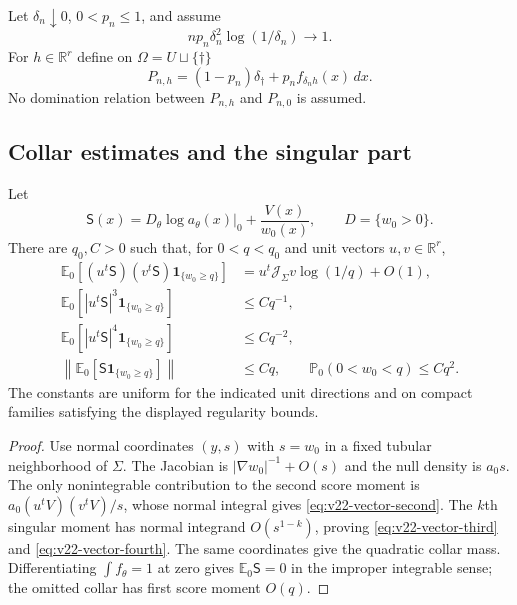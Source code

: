 Let $\delta_n\downarrow0$, $0<p_n\le1$, and assume
\begin{equation}\label{eq:v22-vector-rate}
 n p_n\delta_n^2\log(1/\delta_n)\longrightarrow1.
\end{equation}
For $h\in\mathbb R^r$ define on
$\Omega=U\sqcup\{\dagger\}$
\begin{equation}\label{eq:v22-thinned-family}
 P_{n,h}=(1-p_n)\delta_\dagger+p_nf_{\delta_nh}(x)\,dx.
\end{equation}
No domination relation between $P_{n,h}$ and $P_{n,0}$ is assumed.

\subsection{Collar estimates and the singular part}

\begin{lemma}
\label{lem:v22-vector-collar}
Let
\[
 \mathsf S(x)=D_\theta\log a_\theta(x)|_0+\frac{V(x)}{w_0(x)},
 \qquad D=\{w_0>0\}.
\]
There are $q_0,C>0$ such that, for $0<q<q_0$ and unit vectors
$u,v\in\mathbb R^r$,
\begin{align}
 \mathbb E_0[(u^t\mathsf S)(v^t\mathsf S)
       \mathbf1_{\{w_0\ge q\}}]
 &=u^t\mathcal J_\Sigma v\log(1/q)+O(1),
                                      \label{eq:v22-vector-second}\\
 \mathbb E_0[|u^t\mathsf S|^3\mathbf1_{\{w_0\ge q\}}]
 &\le Cq^{-1},                       \label{eq:v22-vector-third}\\
 \mathbb E_0[|u^t\mathsf S|^4\mathbf1_{\{w_0\ge q\}}]
 &\le Cq^{-2},                       \label{eq:v22-vector-fourth}\\
 \left\|\mathbb E_0[\mathsf S\mathbf1_{\{w_0\ge q\}}]\right\|
 &\le Cq,
 \qquad
 \mathbb P_0(0<w_0<q)\le Cq^2.      \label{eq:v22-vector-centering}
\end{align}
The constants are uniform for the indicated unit directions and on compact
families satisfying the displayed regularity bounds.
\end{lemma}

\begin{proof}
Use normal coordinates $(y,s)$ with $s=w_0$ in a fixed tubular neighborhood
of $\Sigma$.  The Jacobian is $|\nabla w_0|^{-1}+O(s)$ and the null density
is $a_0s$.  The only nonintegrable contribution to the second score moment is
$a_0(u^tV)(v^tV)/s$, whose normal integral gives
\eqref{eq:v22-vector-second}.  The $k$th singular moment has normal integrand
$O(s^{1-k})$, proving \eqref{eq:v22-vector-third} and
\eqref{eq:v22-vector-fourth}.  The same coordinates give the quadratic collar
mass.  Differentiating $\int f_\theta=1$ at zero gives
$\mathbb E_0\mathsf S=0$ in the improper integrable sense; the omitted collar
has first score moment $O(q)$.
\end{proof}

